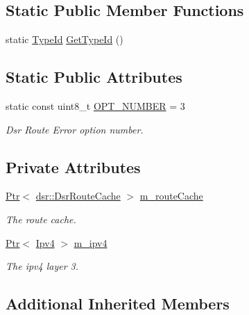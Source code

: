 \subsection*{Static Public Member Functions}
\begin{DoxyCompactItemize}
\item 
static \hyperlink{classns3_1_1TypeId}{Type\+Id} \hyperlink{classns3_1_1dsr_1_1DsrOptionRerr_a9a92dddbabd9aca62d85a34bd7d3a076}{Get\+Type\+Id} ()
\end{DoxyCompactItemize}
\subsection*{Static Public Attributes}
\begin{DoxyCompactItemize}
\item 
static const uint8\+\_\+t \hyperlink{classns3_1_1dsr_1_1DsrOptionRerr_a50ef8ca32520f468cc263e0703c076c0}{O\+P\+T\+\_\+\+N\+U\+M\+B\+ER} = 3
\begin{DoxyCompactList}\small\item\em Dsr Route Error option number. \end{DoxyCompactList}\end{DoxyCompactItemize}
\subsection*{Private Attributes}
\begin{DoxyCompactItemize}
\item 
\hyperlink{classns3_1_1Ptr}{Ptr}$<$ \hyperlink{classns3_1_1dsr_1_1DsrRouteCache}{dsr\+::\+Dsr\+Route\+Cache} $>$ \hyperlink{classns3_1_1dsr_1_1DsrOptionRerr_a2838243fd731529ca285ca65c02bcf58}{m\+\_\+route\+Cache}
\begin{DoxyCompactList}\small\item\em The route cache. \end{DoxyCompactList}\item 
\hyperlink{classns3_1_1Ptr}{Ptr}$<$ \hyperlink{classns3_1_1Ipv4}{Ipv4} $>$ \hyperlink{classns3_1_1dsr_1_1DsrOptionRerr_a03813d39437d7932187ecd0033ac6fd3}{m\+\_\+ipv4}
\begin{DoxyCompactList}\small\item\em The ipv4 layer 3. \end{DoxyCompactList}\end{DoxyCompactItemize}
\subsection*{Additional Inherited Members}


